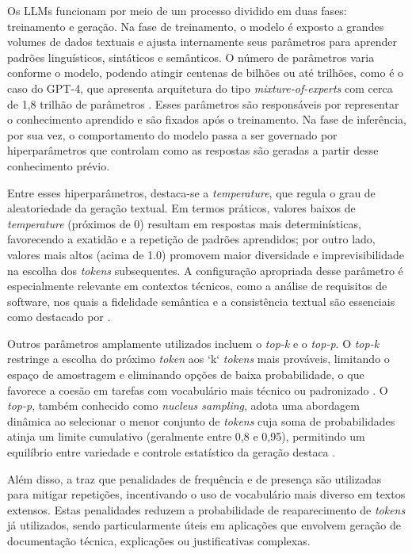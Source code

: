 Os LLMs funcionam por meio de um processo dividido em duas fases: treinamento e geração. Na fase de treinamento, o modelo é exposto a grandes volumes de dados textuais e ajusta internamente seus parâmetros para aprender padrões linguísticos, sintáticos e semânticos. O número de parâmetros varia conforme o modelo, podendo atingir centenas de bilhões ou até trilhões, como é o caso do GPT-4, que apresenta arquitetura do tipo \textit{mixture-of-experts} com cerca de 1,8 trilhão de parâmetros . Esses parâmetros são responsáveis por representar o conhecimento aprendido e são fixados após o treinamento. Na fase de inferência, por sua vez, o comportamento do modelo passa a ser governado por hiperparâmetros que controlam como as respostas são geradas a partir desse conhecimento prévio.

Entre esses hiperparâmetros, destaca-se a \textit{temperature}, que regula o grau de aleatoriedade da geração textual. Em termos práticos, valores baixos de \textit{temperature} (próximos de 0) resultam em respostas mais determinísticas, favorecendo a exatidão e a repetição de padrões aprendidos; por outro lado, valores mais altos (acima de 1.0) promovem maior diversidade e imprevisibilidade na escolha dos \textit{tokens} subsequentes. A configuração apropriada desse parâmetro é especialmente relevante em contextos técnicos, como a análise de requisitos de software, nos quais a fidelidade semântica e a consistência textual são essenciais como destacado por .

Outros parâmetros amplamente utilizados incluem o \textit{top-k} e o \textit{top-p}. O \textit{top-k} restringe a escolha do próximo \textit{token} aos `k` \textit{tokens} mais prováveis, limitando o espaço de amostragem e eliminando opções de baixa probabilidade, o que favorece a coesão em tarefas com vocabulário mais técnico ou padronizado . O \textit{top-p}, também conhecido como \textit{nucleus sampling}, adota uma abordagem dinâmica ao selecionar o menor conjunto de \textit{tokens} cuja soma de probabilidades atinja um limite cumulativo (geralmente entre 0,8 e 0,95), permitindo um equilíbrio entre variedade e controle estatístico da geração destaca  .

Além disso, a  traz que penalidades de frequência e de presença são utilizadas para mitigar repetições, incentivando o uso de vocabulário mais diverso em textos extensos. Estas penalidades reduzem a probabilidade de reaparecimento de \textit{tokens} já utilizados, sendo particularmente úteis em aplicações que envolvem geração de documentação técnica, explicações ou justificativas complexas.

